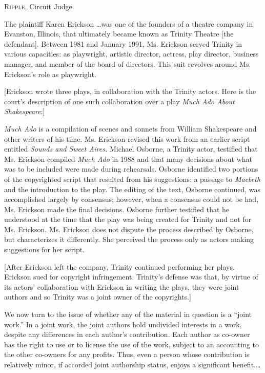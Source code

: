 
\opinion \textsc{Ripple}, Circuit Judge.

The plaintiff Karen Erickson \ldots was one of the founders of a theatre company
in Evanston, Illinois, that ultimately became known as Trinity Theatre [the
defendant]. Between 1981 and January 1991, Ms. Erickson served Trinity in
various capacities: as playwright, artistic director, actress, play director,
business manager, and member of the board of directors. This suit revolves
around Ms. Erickson's role as playwright.

[Erickson wrote three plays, in collaboration with the Trinity actors. Here is
the court's description of one such collaboration over a play \emph{Much Ado
About Shakespeare}:]

\emph{Much Ado} is a
compilation of scenes and sonnets from William Shakespeare and other writers of
his time. Ms. Erickson revised this work from an earlier script entitled
\textit{Sounds and Sweet Aires.} Michael Osborne, a Trinity actor, testified
that Ms. Erickson compiled \textit{Much Ado} in 1988 and that many decisions
about what was to be included were made during rehearsals. Osborne identified
two portions of the copyrighted script that resulted from his suggestions: a
passage to \textit{Macbeth} and the  introduction to the play. The editing of
the text, Osborne continued, was accomplished largely by consensus; however,
when a consensus could not be had, Ms. Erickson made the final decisions.
Osborne further testified that he understood at the time that the play was being
created for Trinity and not for Ms. Erickson. Ms. Erickson does not dispute the
process described by Osborne, but characterizes it differently. She perceived
the process only as actors making suggestions for her script.

[After Erickson left the company, Trinity continued performing her plays.
Erickson sued for copyright infringement. Trinity's defense was that, by virtue
of its actors' collaboration with Erickson in writing the plays, they were joint
authors and so Trinity was a joint owner of the copyrights.]

We now turn to the issue of whether any of the material in question is a ``joint
work.'' In a joint work, the joint authors hold undivided interests in a work,
despite any differences in each author's contribution. Each
author as co-owner has the right to use or to license the use of the work,
subject to an accounting to the other co-owners for any profits.
Thus, even a person whose contribution is
relatively minor, if accorded joint authorship status, enjoys a significant
benefit.\ldots

